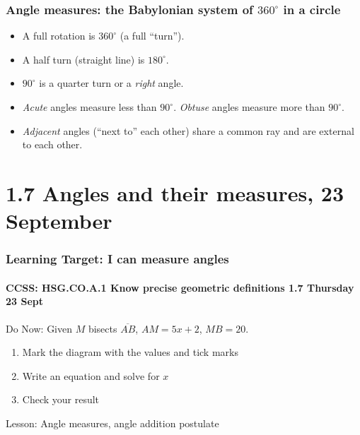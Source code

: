 \documentclass{beamer}
\begin{document}
  \frame
  {
    \frametitle{Angle measures: the Babylonian system of $360^\circ$ in a circle}
      \begin{itemize}
        \item A full rotation is $360^\circ$ (a full ``turn'').
        \item A half turn (straight line) is $180^\circ$.
        \item $90^\circ$ is a quarter turn or a \emph{right} angle.
        \item \emph{Acute} angles measure less than $90^\circ$. \emph{Obtuse} angles measure more than $90^\circ$.
        \item \emph{Adjacent} angles (``next to'' each other) share a common ray and are external to each other.
      \end{itemize}
    \begin{center}
      \end{center}
  }

  \section{1.7 Angles and their measures, 23 September}
  \frame
  {
    \frametitle{Learning Target: I can measure angles}
    \framesubtitle{CCSS: HSG.CO.A.1 Know precise geometric definitions  \hfill \alert{1.7 Thursday 23 Sept}}
  
    \begin{block}{Do Now: Given $M$ bisects $\overline{AB}$, $AM=5x+2$, $MB=20$.}
      \begin{enumerate}
        \item Mark the diagram with the values and tick marks
        \item Write an equation and solve for $x$
        \item Check your result
      \end{enumerate} \vspace{1cm}
        \begin{center}
        \end{center}
    \end{block}
    Lesson: Angle measures, angle addition postulate
  }
  
\end{document}

